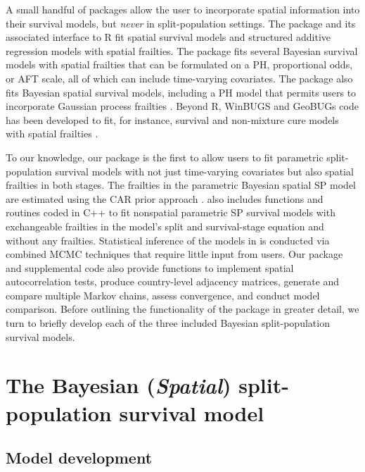 A small handful of packages allow the user to incorporate spatial information into their survival models, but \textit{never} in split-population settings. The  package \citep{BayesX} and its associated interface to R   \citep{R2BayesX-pkg} fit spatial survival models and structured additive regression models with spatial frailties.  The  package \citep{spBayesSurv-pkg} fits several Bayesian survival models with spatial frailties that can be formulated on a PH, proportional odds, or AFT scale, all of which can include time-varying covariates. The  package also fits Bayesian spatial survival models, including a PH model that permits users to incorporate Gaussian process frailties \citep{spatsurv-pkg}. Beyond R, WinBUGS and GeoBUGs code has been developed to fit, for instance, survival and non-mixture cure models with spatial frailties \citep{banerjee2003frailty,banerjee2004spatial,thomas2004geobugs}.  

To our knowledge, our  package is the first to allow users to fit parametric split-population survival models with not just time-varying covariates but also spatial frailties in both stages. The frailties in the parametric Bayesian spatial SP model are estimated using the CAR prior approach \citep{besag1991bayesian,bernardinelli1995bayesian,banerjee2003frailty,banerjee2004parametric}.  also includes functions and routines coded in C++ to fit nonspatial parametric SP survival models with exchangeable frailties in the model’s split and survival-stage equation and without any frailties. Statistical inference of the models in  is conducted via combined MCMC techniques that require little input from users. Our package and supplemental code also provide functions to implement spatial autocorrelation tests, produce country-level adjacency matrices, generate and compare multiple Markov chains, assess convergence, and conduct model comparison. Before outlining the functionality of the package in greater detail, we turn to briefly develop each of the three included Bayesian split-population survival models.


\section{The Bayesian (\emph{Spatial}) split-population survival model}

\subsection{Model development}

